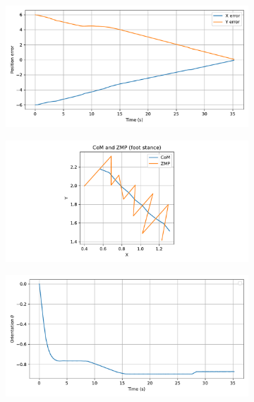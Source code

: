 \begin{figure}[H]
    \centering
    \begin{subfigure}{0.45\linewidth}
        \centering
        \includegraphics[width=\linewidth]{figures/Simulations/sim1circles_delta/evolution_0.pdf}
    \end{subfigure}
    \begin{subfigure}{0.45\linewidth}
        \centering
        \includegraphics[width=\linewidth]{figures/Simulations/sim1circles_delta/evolution_5.pdf}
    \end{subfigure}
    \hfill
    \begin{subfigure}{0.45\linewidth}
        \centering
        \includegraphics[width=\linewidth]{figures/Simulations/sim1circles_delta/evolution_2.pdf}

\end{subfigure}
\end{figure}
